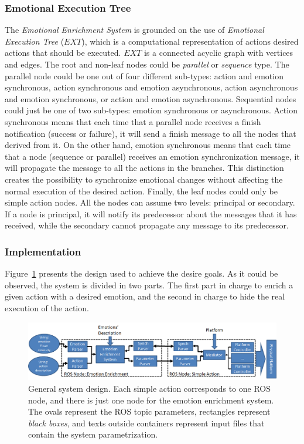 \subsubsection{Emotional Execution Tree}
The \textit{Emotional Enrichment System}  is grounded on the use of \textit{Emotional Execution Tree} ($EXT$), which is a computational representation of actions desired actions that should be executed. 
$EXT$ is a connected acyclic graph with vertices and  edges. The root and non-leaf nodes could be \textit{parallel} or \textit{sequence} type. The parallel node could be one out of four different sub-types: action and emotion synchronous, action synchronous and emotion asynchronous, action asynchronous and emotion synchronous, or action and emotion asynchronous. Sequential nodes could just be one of two sub-types: emotion synchronous or asynchronous. Action synchronous means that each time that a parallel node receives a finish notification (success or failure), it will send a finish message to all the nodes that derived from it. On the other hand, emotion synchronous means that each time that a node (sequence or parallel) receives an emotion synchronization message, it will propagate the message to all the actions in the branches. 
This distinction creates the possibility to synchronize emotional changes without affecting the normal execution of the desired action. Finally, the leaf nodes could only be simple action nodes. All the nodes can assume two levels: principal or secondary. If a node is principal, it will notify its predecessor about the messages that it has received, while the secondary cannot propagate any message to its predecessor.

\subsubsection{Implementation}
Figure~\ref{fig:system_architecture} presents the design used to achieve the desire goals. As it could be observed, the system is divided in two parts. The first part in charge to enrich a given action with a desired emotion, and the second in charge to hide the real execution of the action. 

\begin{figure}
	\centering
	\includegraphics[width=1.0\textwidth]{Images/SystemArchitecture.png} 	
	\caption{General system design. Each simple action corresponds to one ROS node, and there is just one node for the emotion enrichment system. The ovals represent the ROS topic parameters, rectangles represent \textit{black boxes}, and texts outside containers represent input files that contain the system parametrization.}
	\label{fig:system_architecture}
\end{figure}

